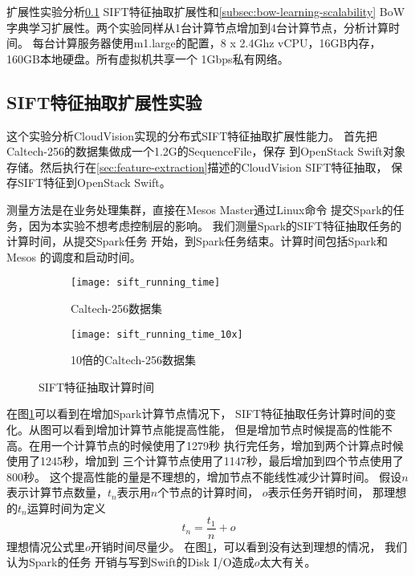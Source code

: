 扩展性实验分析\ref{subsec:sift-scalability} SIFT特征抽取扩展性和\ref{subsec:bow-learning-scalability}
BoW字典学习扩展性。两个实验同样从1台计算节点增加到4台计算节点，分析计算时间。
每台计算服务器使用m1.large的配置，8 x 2.4Ghz vCPU，16GB内存，160GB本地硬盘。所有虚拟机共享一个
1Gbps私有网络。

\subsection{SIFT特征抽取扩展性实验}
\label{subsec:sift-scalability}
这个实验分析CloudVision实现的分布式SIFT特征抽取扩展性能力。
首先把Caltech-256的数据集做成一个1.2G的SequenceFile，保存
到OpenStack Swift对象存储。然后执行在\ref{sec:feature-extraction}描述的CloudVision SIFT特征抽取，
保存SIFT特征到OpenStack Swift。

测量方法是在业务处理集群，直接在Mesos Master通过Linux命令
提交Spark的任务，因为本实验不想考虑控制层的影响。
我们测量Spark的SIFT特征抽取任务的计算时间，从提交Spark任务
开始，到Spark任务结束。计算时间包括Spark和Mesos
的调度和启动时间。

\begin{figure}[h]
  \captionsetup[subfigure]{aboveskip=2pt,belowskip=2pt}
  \centering
  \begin{subfigure}[b]{0.49\textwidth}
    \texttt{[image: sift\_running\_time]}
    \caption{Caltech-256数据集}
    \label{fig:sift-running-time}
  \end{subfigure}
  \begin{subfigure}[b]{0.49\textwidth}
    \texttt{[image: sift\_running\_time\_10x]}
    \caption{10倍的Caltech-256数据集}
    \label{fig:sift-running-time-10x}
  \end{subfigure}
  \caption{SIFT特征抽取计算时间}

\end{figure}

在图\ref{fig:sift-running-time}可以看到在增加Spark计算节点情况下，
SIFT特征抽取任务计算时间的变化。从图可以看到增加计算节点能提高性能，
但是增加节点时候提高的性能不高。在用一个计算节点的时候使用了1279秒
执行完任务，增加到两个计算点时候使用了1245秒，增加到
三个计算节点使用了1147秒，最后增加到四个节点使用了800秒。
这个提高性能的量是不理想的，增加节点不能线性减少计算时间。
假设$n$表示计算节点数量，$t_n$表示用$n$个节点的计算时间，
$o$表示任务开销时间，
那理想的$t_n$运算时间为定义
\begin{equation} \label{eq:running-time}
t_n = \frac{t_1}{n} + o
\end{equation}
理想情况公式里$o$开销时间尽量少。
在图\ref{fig:sift-running-time}，可以看到没有达到理想的情况，
我们认为Spark的任务
开销与写到Swift的Disk I/O造成$o$太大有关。

